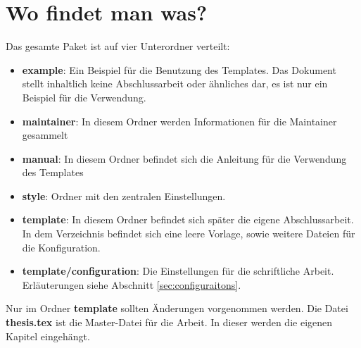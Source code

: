%
\section{Wo findet man was?}\label{sec:wheretofindwhat}
Das gesamte Paket ist auf vier Unterordner verteilt:
\begin{itemize}
\item \textbf{example}: Ein Beispiel für die Benutzung des Templates. Das Dokument stellt inhaltlich keine Abschlussarbeit oder ähnliches dar, es ist nur ein Beispiel für die Verwendung.
\item \textbf{maintainer}: In diesem Ordner werden Informationen für die Maintainer gesammelt
\item \textbf{manual}: In diesem Ordner befindet sich die Anleitung für die Verwendung des Templates
\item \textbf{style}: Ordner mit den zentralen Einstellungen.
\item \textbf{template}: In diesem Ordner befindet sich später die eigene Abschlussarbeit. In dem Verzeichnis befindet sich eine leere Vorlage, sowie weitere Dateien für die Konfiguration.
\item \textbf{template/configuration}: Die Einstellungen für die schriftliche Arbeit. Erläuterungen siehe Abschnitt \ref{sec:configuraitons}.
\end{itemize}

Nur im Ordner \textbf{template} sollten Änderungen vorgenommen werden. Die Datei \textbf{thesis.tex} ist die Master-Datei für die Arbeit. In dieser werden die eigenen Kapitel eingehängt.
